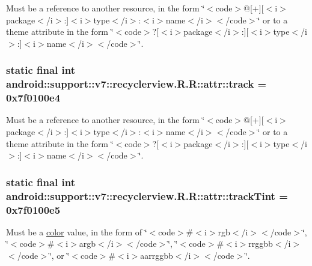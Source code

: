 Must be a reference to another resource, in the form \char`\"{}$<$code$>$@\mbox{[}+\mbox{]}\mbox{[}$<$i$>$package$<$/i$>$:\mbox{]}$<$i$>$type$<$/i$>$:$<$i$>$name$<$/i$>$$<$/code$>$\char`\"{} or to a theme attribute in the form \char`\"{}$<$code$>$?\mbox{[}$<$i$>$package$<$/i$>$:\mbox{]}\mbox{[}$<$i$>$type$<$/i$>$:\mbox{]}$<$i$>$name$<$/i$>$$<$/code$>$\char`\"{}. \hypertarget{classandroid_1_1support_1_1v7_1_1recyclerview_1_1_r_1_1attr_c969bb58ffc3737c1d0cd372bad07a15}{
\subsubsection[{track}]{\setlength{\rightskip}{0pt plus 5cm}static final int android::support::v7::recyclerview.R.R::attr::track = 0x7f0100e4}}
\label{classandroid_1_1support_1_1v7_1_1recyclerview_1_1_r_1_1attr_c969bb58ffc3737c1d0cd372bad07a15}


Must be a reference to another resource, in the form \char`\"{}$<$code$>$@\mbox{[}+\mbox{]}\mbox{[}$<$i$>$package$<$/i$>$:\mbox{]}$<$i$>$type$<$/i$>$:$<$i$>$name$<$/i$>$$<$/code$>$\char`\"{} or to a theme attribute in the form \char`\"{}$<$code$>$?\mbox{[}$<$i$>$package$<$/i$>$:\mbox{]}\mbox{[}$<$i$>$type$<$/i$>$:\mbox{]}$<$i$>$name$<$/i$>$$<$/code$>$\char`\"{}. \hypertarget{classandroid_1_1support_1_1v7_1_1recyclerview_1_1_r_1_1attr_59b4e6a3106470a6ed145d67aa2c3e3e}{
\subsubsection[{trackTint}]{\setlength{\rightskip}{0pt plus 5cm}static final int android::support::v7::recyclerview.R.R::attr::trackTint = 0x7f0100e5}}
\label{classandroid_1_1support_1_1v7_1_1recyclerview_1_1_r_1_1attr_59b4e6a3106470a6ed145d67aa2c3e3e}


Must be a \hyperlink{classandroid_1_1support_1_1v7_1_1recyclerview_1_1_r_1_1color}{color} value, in the form of \char`\"{}$<$code$>$\#$<$i$>$rgb$<$/i$>$$<$/code$>$\char`\"{}, \char`\"{}$<$code$>$\#$<$i$>$argb$<$/i$>$$<$/code$>$\char`\"{}, \char`\"{}$<$code$>$\#$<$i$>$rrggbb$<$/i$>$$<$/code$>$\char`\"{}, or \char`\"{}$<$code$>$\#$<$i$>$aarrggbb$<$/i$>$$<$/code$>$\char`\"{}. 

